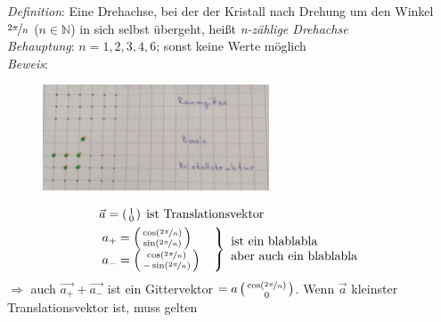 \documentclass[paper=A4,12pt,pagesize,twoside,BCOR=8mm,ngerman]{scrartcl}
\newenvironment{rcases}{%
  \left.\renewcommand*\lbrace.%
  \begin{cases}}%
{\end{cases}\right\rbrace}
\begin{document}
			\emph{Definition}: Eine Drehachse, bei der der Kristall nach 
			Drehung um den Winkel $\nicefrac{2\pi}{n}$ 
			($n \in \mathbb{N}$) in sich selbst übergeht, heißt 
			\emph{n-zählige Drehachse}\\
			\emph{Behauptung}: $n=1, 2, 3, 4, 6$; sonst keine Werte 
			möglich\\
			\emph{Beweis}: 
			\begin{figure}[H]
					\centering
					\includegraphics[width=0.6\textwidth]
					{pics/pic003.jpg}
			\end{figure}
			\begin{align*}
				&\vec{a}=\left( \begin{smallmatrix} 1 \\ 0 
				\end{smallmatrix}
				\right)	\;\text{ist Translationsvektor}\\
				&\begin{rcases}
					a_+ = \left( \begin{smallmatrix} \cos 
					(\nicefrac{2\pi}{n}) \\ \sin (\nicefrac{2\pi}{n}) 
					\end{smallmatrix} \right)\\
					a_- = \left( \begin{smallmatrix} \cos 
					(\nicefrac{2\pi}{n}) \\ -\sin (\nicefrac{2\pi}{n}) 
					\end{smallmatrix} \right)\\
				\end{rcases}
				\begin{array}{l}
					\text{ist ein blablabla}\\
					\text{aber auch ein blablabla}
				\end{array}
			\end{align*}
			$\Rightarrow$ auch $\vec{a_+}+\vec{a_-}$ ist ein 
			Gittervektor $=a \left( \begin{smallmatrix} \cos 
			(\nicefrac{2\pi}{n})\\ 0 \end{smallmatrix} \right)$. Wenn 
			$\vec{a}$ kleinster Translationsvektor ist, muss gelten
\end{document}
